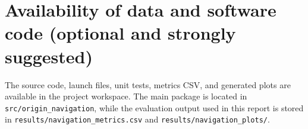 \documentclass[12pt,a4paper]{cibb}
\begin{document}
\section*{Availability of data and software code (optional and strongly suggested)}
\label{sec:AVAILABILITY}
The source code, launch files, unit tests, metrics CSV, and generated plots are available in the project workspace. The main package is located in \texttt{src/origin\_navigation}, while the evaluation output used in this report is stored in \texttt{results/navigation\_metrics.csv} and \texttt{results/navigation\_plots/}.

\footnotesize


\normalsize
\end{document}

